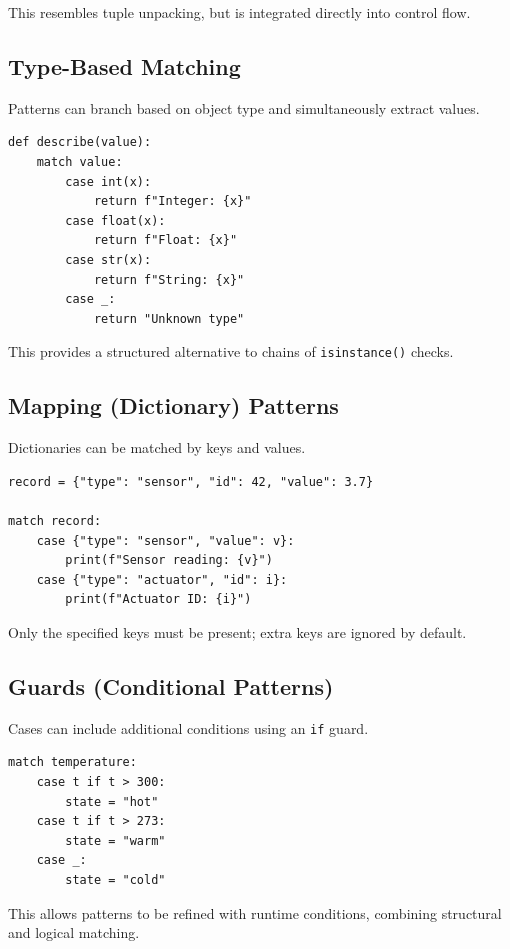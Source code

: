 This resembles tuple unpacking, but is integrated directly into control flow.

\subsection{Type-Based Matching}

Patterns can branch based on object type and simultaneously extract values.

\begin{verbatim}
def describe(value):
    match value:
        case int(x):
            return f"Integer: {x}"
        case float(x):
            return f"Float: {x}"
        case str(x):
            return f"String: {x}"
        case _:
            return "Unknown type"
\end{verbatim}

This provides a structured alternative to chains of \texttt{isinstance()} checks.

\subsection{Mapping (Dictionary) Patterns}

Dictionaries can be matched by keys and values.

\begin{verbatim}
record = {"type": "sensor", "id": 42, "value": 3.7}

match record:
    case {"type": "sensor", "value": v}:
        print(f"Sensor reading: {v}")
    case {"type": "actuator", "id": i}:
        print(f"Actuator ID: {i}")
\end{verbatim}

Only the specified keys must be present; extra keys are ignored by default.

\subsection{Guards (Conditional Patterns)}

Cases can include additional conditions using an \texttt{if} guard.

\begin{verbatim}
match temperature:
    case t if t > 300:
        state = "hot"
    case t if t > 273:
        state = "warm"
    case _:
        state = "cold"
\end{verbatim}

This allows patterns to be refined with runtime conditions, combining structural and logical matching.


